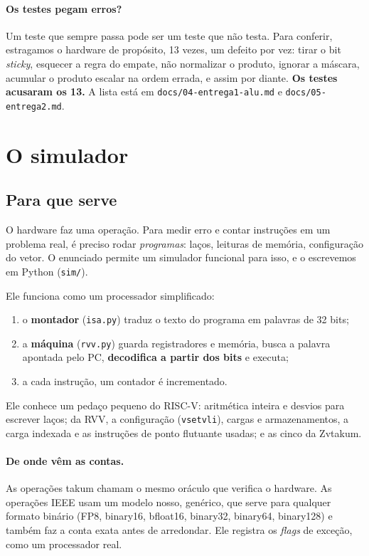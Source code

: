 \documentclass[11pt,a4paper]{article}
\newcommand{\code}[1]{\texttt{#1}}
\begin{document}
\paragraph{Os testes pegam erros?} Um teste que sempre passa pode ser um teste que não testa. Para
conferir, estragamos o hardware de propósito, 13 vezes, um defeito por vez: tirar o bit \emph{sticky},
esquecer a regra do empate, não normalizar o produto, ignorar a máscara, acumular o produto escalar na
ordem errada, e assim por diante. \textbf{Os testes acusaram os 13.} A lista está em
\code{docs/04-entrega1-alu.md} e \code{docs/05-entrega2.md}.

\section{O simulador}

\subsection{Para que serve}

O hardware faz uma operação. Para medir erro e contar instruções em um problema real, é preciso rodar
\emph{programas}: laços, leituras de memória, configuração do vetor. O enunciado permite um simulador
funcional para isso, e o escrevemos em Python (\code{sim/}).

Ele funciona como um processador simplificado:
\begin{enumerate}[nosep]
  \item o \textbf{montador} (\code{isa.py}) traduz o texto do programa em palavras de 32 bits;
  \item a \textbf{máquina} (\code{rvv.py}) guarda registradores e memória, busca a palavra apontada pelo
        PC, \textbf{decodifica a partir dos bits} e executa;
  \item a cada instrução, um contador é incrementado.
\end{enumerate}

Ele conhece um pedaço pequeno do RISC-V: aritmética inteira e desvios para escrever laços; da RVV, a
configuração (\code{vsetvli}), cargas e armazenamentos, a carga indexada e as instruções de ponto
flutuante usadas; e as cinco da Zvtakum.

\paragraph{De onde vêm as contas.} As operações takum chamam o mesmo oráculo que verifica o hardware. As
operações IEEE usam um modelo nosso, genérico, que serve para qualquer formato binário (FP8, binary16,
bfloat16, binary32, binary64, binary128) e também faz a conta exata antes de arredondar. Ele registra os
\emph{flags} de exceção, como um processador real.
\end{document}
